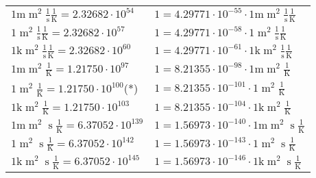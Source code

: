 \begin{center}
\begin{longtable}{l l}
{\color{gray}$1 \bm{\mathrm{ m}}{\operatorname{m}^2}\frac1{\operatorname{s}}{}\frac1{\operatorname{K}} = 2.32682\cdot10^{54} $}   & {\color{gray}$ 1 = 4.29771\cdot10^{-55} \cdot 1 \bm{\mathrm{ m}}{\operatorname{m}^2}\frac1{\operatorname{s}}{}\frac1{\operatorname{K}}$}  \\
{\color{black}$1 \bm{\mathrm{ }}{\operatorname{m}^2}\frac1{\operatorname{s}}{}\frac1{\operatorname{K}} = 2.32682\cdot10^{57} $}   & {\color{black}$ 1 = 4.29771\cdot10^{-58} \cdot 1 \bm{\mathrm{ }}{\operatorname{m}^2}\frac1{\operatorname{s}}{}\frac1{\operatorname{K}}$}  \\
{\color{gray}$1 \bm{\mathrm{ k}}{\operatorname{m}^2}\frac1{\operatorname{s}}{}\frac1{\operatorname{K}} = 2.32682\cdot10^{60} $}   & {\color{gray}$ 1 = 4.29771\cdot10^{-61} \cdot 1 \bm{\mathrm{ k}}{\operatorname{m}^2}\frac1{\operatorname{s}}{}\frac1{\operatorname{K}}$}  \\
{\color{gray}$1 \bm{\mathrm{ m}}{\operatorname{m}^2}{}{}\frac1{\operatorname{K}} = 1.21750\cdot10^{97} $}   & {\color{gray}$ 1 = 8.21355\cdot10^{-98} \cdot 1 \bm{\mathrm{ m}}{\operatorname{m}^2}{}{}\frac1{\operatorname{K}}$}  \\
{\color{black}$1 \bm{\mathrm{ }}{\operatorname{m}^2}{}{}\frac1{\operatorname{K}} = 1.21750\cdot10^{100} $}\quad(*) & {\color{black}$ 1 = 8.21355\cdot10^{-101} \cdot 1 \bm{\mathrm{ }}{\operatorname{m}^2}{}{}\frac1{\operatorname{K}}$}  \\
{\color{gray}$1 \bm{\mathrm{ k}}{\operatorname{m}^2}{}{}\frac1{\operatorname{K}} = 1.21750\cdot10^{103} $}   & {\color{gray}$ 1 = 8.21355\cdot10^{-104} \cdot 1 \bm{\mathrm{ k}}{\operatorname{m}^2}{}{}\frac1{\operatorname{K}}$}  \\
{\color{gray}$1 \bm{\mathrm{ m}}{\operatorname{m}^2}{\operatorname{s}}{}\frac1{\operatorname{K}} = 6.37052\cdot10^{139} $}   & {\color{gray}$ 1 = 1.56973\cdot10^{-140} \cdot 1 \bm{\mathrm{ m}}{\operatorname{m}^2}{\operatorname{s}}{}\frac1{\operatorname{K}}$}  \\
{\color{black}$1 \bm{\mathrm{ }}{\operatorname{m}^2}{\operatorname{s}}{}\frac1{\operatorname{K}} = 6.37052\cdot10^{142} $}   & {\color{black}$ 1 = 1.56973\cdot10^{-143} \cdot 1 \bm{\mathrm{ }}{\operatorname{m}^2}{\operatorname{s}}{}\frac1{\operatorname{K}}$}  \\
{\color{gray}$1 \bm{\mathrm{ k}}{\operatorname{m}^2}{\operatorname{s}}{}\frac1{\operatorname{K}} = 6.37052\cdot10^{145} $}   & {\color{gray}$ 1 = 1.56973\cdot10^{-146} \cdot 1 \bm{\mathrm{ k}}{\operatorname{m}^2}{\operatorname{s}}{}\frac1{\operatorname{K}}$}  \\

\end{longtable}
\end{center}

